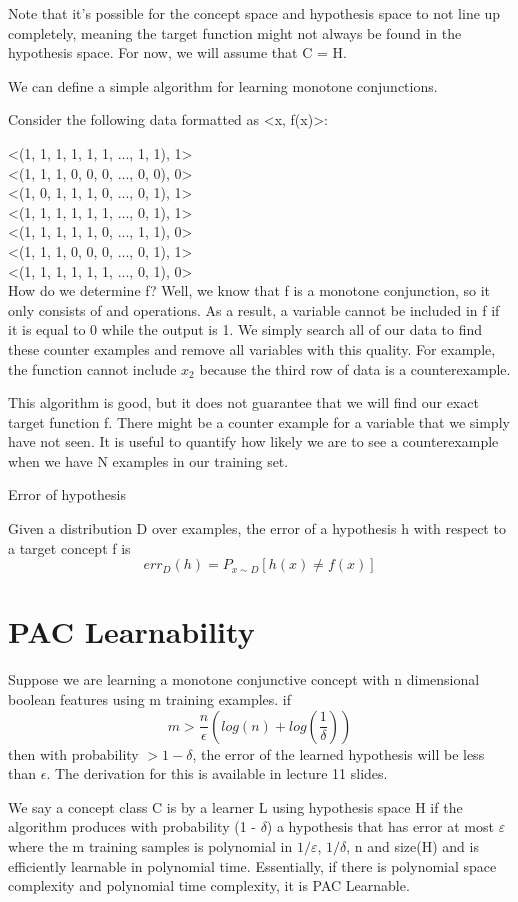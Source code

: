 Note that it's possible for the concept space and hypothesis space to not line up completely, meaning the target function might not always be found in the hypothesis space. For now, we will assume that C = H.

\hr

We can define a simple algorithm for learning monotone conjunctions.

Consider the following data formatted as <x, f(x)>:

<(1, 1, 1, 1, 1, 1, ..., 1, 1), 1> \\
<(1, 1, 1, 0, 0, 0, ..., 0, 0), 0> \\
<(1, 0, 1, 1, 1, 0, ..., 0, 1), 1> \\
<(1, 1, 1, 1, 1, 1, ..., 0, 1), 1> \\
<(1, 1, 1, 1, 1, 0, ..., 1, 1), 0> \\
<(1, 1, 1, 0, 0, 0, ..., 0, 1), 1> \\
<(1, 1, 1, 1, 1, 1, ..., 0, 1), 0> \\

How do we determine f? Well, we know that f is a monotone conjunction, so it only consists of and operations. As a result, a variable cannot be included in f if it is equal to 0 while the output is 1. We simply search all of our data to find these counter examples and remove all variables with this quality. For example, the function cannot include $x_2$ because the third row of data is a counterexample.

This algorithm is good, but it does not guarantee that we will find our exact target function f. There might be a counter example for a variable that we simply have not seen. It is useful to quantify how likely we are to see a counterexample when we have N examples in our training set.

\begin{definition}
    Error of hypothesis

    Given a distribution D over examples, the error of a hypothesis h with respect to a target concept f is 
    \[
        err_D(h) = P_{x \sim D}[h(x) \neq f(x)]
    \]
\end{definition}

\section{PAC Learnability}


Suppose we are learning a monotone conjunctive concept with n dimensional boolean features using m training examples. if
\[
    m > \frac{n}{\epsilon}(log(n) + log(\frac{1}{\delta}))  
\]
then with probability $> 1 - \delta$, the error of the learned hypothesis will be less than $\epsilon$. The derivation for this is available in lecture 11 slides.

We say a concept class C is  by a learner L using hypothesis space H if the algorithm produces with probability (1 - $\delta$) a hypothesis that has error at most $\varepsilon$ where the m training samples is polynomial in $1 / \varepsilon$, $1 / \delta$, n and size(H) and is efficiently learnable in polynomial time. Essentially, if there is polynomial space complexity and polynomial time complexity, it is PAC Learnable.